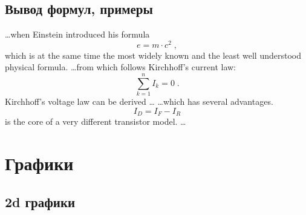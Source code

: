 \documentclass[oneside,final,14pt]{extreport}
\begin{document}
\subsection{Вывод формул, примеры}
\ldots when Einstein introduced his formula
\begin{equation}
    e = m \cdot c^2 \; ,
\end{equation}
which is at the same time the most widely known
and the least well understood physical formula.
\ldots from which follows Kirchhoff's current law:
\begin{equation}
    \sum_{k=1}^{n} I_k = 0 \; .
\end{equation}
Kirchhoff's voltage law can be derived \ldots
\ldots which has several advantages.
\begin{equation}
    I_D = I_F - I_R
\end{equation}
is the core of a very different transistor model. \ldots
\section{Графики}

\subsection{2d графики}



\tableofcontents
\end{document}
